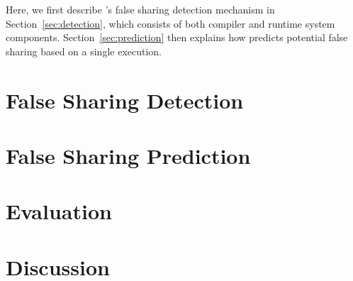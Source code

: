 Here, we first describe \Predator{}'s false sharing detection mechanism in Section~\ref{sec:detection}, which consists of both compiler and runtime system components. Section~\ref{sec:prediction} then explains how \Predator{} predicts potential false sharing based on a single execution.

\section{False Sharing Detection}


\section{False Sharing Prediction}


\section{Evaluation}


\section{Discussion}



